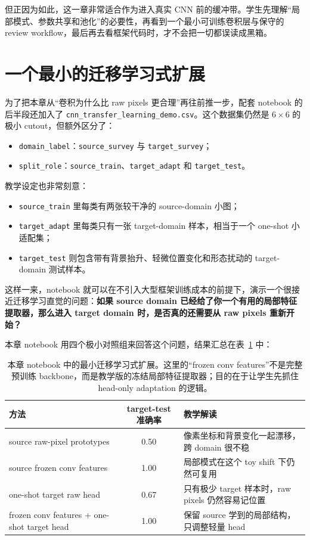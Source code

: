 但正因为如此，这一章非常适合作为进入真实 CNN 前的缓冲带。学生先理解“局部模式、参数共享和池化”的必要性，再看到一个最小可训练卷积层与保守的 review workflow，最后再去看框架代码时，才不会把一切都误读成黑箱。

\section{一个最小的迁移学习式扩展}

为了把本章从“卷积为什么比 raw pixels 更合理”再往前推一步，配套 notebook 的后半段还加入了 \nolinkurl{cnn_transfer_learning_demo.csv}。这个数据集仍然是 \(6\times 6\) 的极小 cutout，但额外区分了：

\begin{itemize}
    \item \texttt{domain\_label}：\texttt{source\_survey} 与 \texttt{target\_survey}；
    \item \texttt{split\_role}：\texttt{source\_train}、\texttt{target\_adapt} 和 \texttt{target\_test}。
\end{itemize}

教学设定也非常刻意：

\begin{itemize}
    \item \texttt{source\_train} 里每类有两张较干净的 source-domain 小图；
    \item \texttt{target\_adapt} 里每类只有一张 target-domain 样本，相当于一个 one-shot 小适配集；
    \item \texttt{target\_test} 则包含带有背景抬升、轻微位置变化和形态扰动的 target-domain 测试样本。
\end{itemize}

这样一来，notebook 就可以在不引入大型框架训练成本的前提下，演示一个很接近迁移学习直觉的问题：\textbf{如果 source domain 已经给了你一个有用的局部特征提取器，那么进入 target domain 时，是否真的还需要从 raw pixels 重新开始？}

本章 notebook 用四个极小对照组来回答这个问题，结果汇总在表~\ref{tab:ch31_transfer_learning_extension} 中：

\begin{table}[htbp]
\centering
\small
\begin{tabular}{>{\raggedright\arraybackslash}p{}c>{\raggedright\arraybackslash}p{}}
\toprule
方法 & target-test 准确率 & 教学解读 \\
\midrule
source raw-pixel prototypes & 0.50 & 像素坐标和背景变化一起漂移，跨 domain 很不稳 \\
source frozen conv features & 1.00 & 局部模式在这个 toy shift 下仍然可复用 \\
one-shot target raw head & 0.67 & 只有极少 target 样本时，raw pixels 仍然容易记位置 \\
frozen conv features + one-shot target head & 1.00 & 保留 source 学到的局部结构，只调整轻量 head \\
\bottomrule
\end{tabular}
\caption{本章 notebook 中的最小迁移学习式扩展。这里的“frozen conv features”不是完整预训练 backbone，而是教学版的冻结局部特征提取器；目的在于让学生先抓住 head-only adaptation 的逻辑。}
\label{tab:ch31_transfer_learning_extension}
\end{table}

